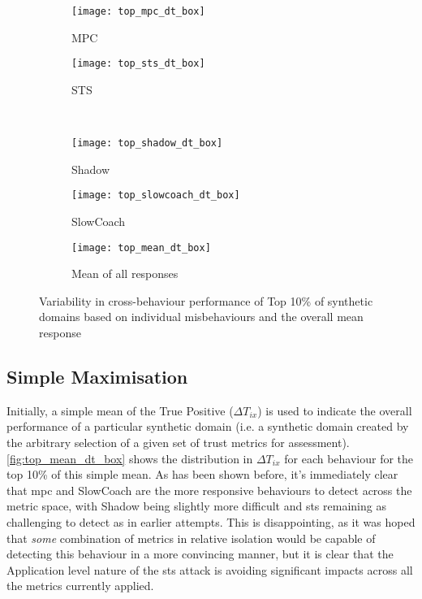 \begin{figure}
	\begin{subfigure}[b]{0.5\textwidth}
		\centering
		\texttt{[image: top\_mpc\_dt\_box]}
		\caption{MPC}
		\label{fig:top_mpc_dt_box}
	\end{subfigure}
	\begin{subfigure}[b]{0.5\textwidth}
		\centering
		\texttt{[image: top\_sts\_dt\_box]}
		\caption{STS}
		\label{fig:top_sts_dt_box}
	\end{subfigure}\\
	
	\begin{subfigure}[b]{0.5\textwidth}
		\centering
		\texttt{[image: top\_shadow\_dt\_box]}
		\caption{Shadow}
		\label{fig:top_shadow_dt_box}
	\end{subfigure}
	\begin{subfigure}[b]{0.5\textwidth}
		\centering
		\texttt{[image: top\_slowcoach\_dt\_box]}
		\caption{SlowCoach}
		\label{fig:top_slowcoach_dt_box}
	\end{subfigure}
	
	\centering
	\begin{subfigure}[b]{0.5\textwidth}
		\centering
		\texttt{[image: top\_mean\_dt\_box]}
		\caption{Mean of all responses}
		\label{fig:top_mean_dt_box}
	\end{subfigure}
	\caption{Variability in cross-behaviour performance of Top 10\% of synthetic domains based on individual misbehaviours and the overall mean response}\label{fig:top_dt_boxes}
\end{figure}

\subsection{Simple Maximisation}
Initially, a simple mean of the True Positive ($\Delta T_{ix}$) is used to indicate the overall performance of a particular synthetic domain (i.e. a synthetic domain created by the arbitrary selection of a given set of trust metrics for assessment).
\autoref{fig:top_mean_dt_box} shows the distribution in $\Delta T_{ix}$ for each behaviour for the top 10\% of this simple mean.
As has been shown before, it's immediately clear that \gls{mpc} and SlowCoach are the more responsive behaviours to detect across the metric space, with Shadow being slightly more difficult and \gls{sts} remaining as challenging to detect as in earlier attempts.
This is disappointing, as it was hoped that \emph{some} combination of metrics in relative isolation would be capable of detecting this behaviour in a more convincing manner, but it is clear that the Application level nature of the \gls{sts} attack is avoiding significant impacts across all the metrics currently applied.

